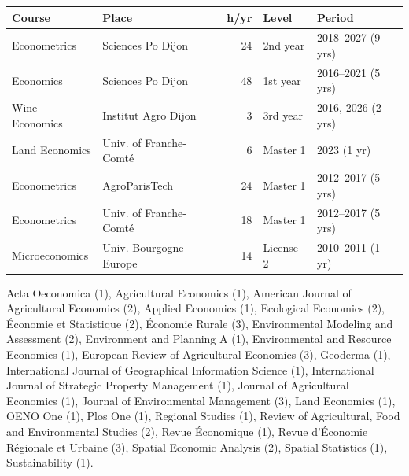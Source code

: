 \documentclass[12pt, a4paper]{./style}
\begin{document}
\begin{center}
\begin{tabular}{llrll}
\textbf{Course} & \textbf{Place} & \textbf{h/yr} & \textbf{Level} & \textbf{Period}\\
\hline
Econometrics & Sciences Po Dijon & 24 & 2nd year & 2018--2027 (9 yrs)\\
Economics & Sciences Po Dijon & 48 & 1st year & 2016--2021 (5 yrs)\\
Wine Economics & Institut Agro Dijon & 3 & 3rd year & 2016, 2026 (2 yrs)\\
Land Economics & Univ. of Franche-Comté & 6 & Master 1 & 2023 (1 yr)\\
Econometrics & AgroParisTech & 24 & Master 1 & 2012--2017 (5 yrs)\\
Econometrics & Univ. of Franche-Comté & 18 & Master 1 & 2012--2017 (5 yrs)\\
Microeconomics & Univ. Bourgogne Europe & 14 & License 2 & 2010--2011 (1 yr)\\
\hline
\end{tabular}
\end{center}
\label{sec:org59dabc6}

\vspace{.5cm}

Acta Oeconomica (1), Agricultural Economics (1), American Journal
of Agricultural Economics (2), Applied Economics (1), Ecological
Economics (2), Économie et Statistique (2), Économie Rurale (3),
Environmental Modeling and Assessment (2), Environment and Planning
A (1), Environmental and Resource Economics (1), European Review of
Agricultural Economics (3), Geoderma (1), International Journal of
Geographical Information Science (1), International Journal of
Strategic Property Management (1), Journal of Agricultural
Economics (1), Journal of Environmental Management (3), Land
Economics (1), OENO One (1), Plos One (1), Regional Studies (1),
Review of Agricultural, Food and Environmental Studies (2), Revue
Économique (1), Revue d'Économie Régionale et Urbaine (3), Spatial
Economic Analysis (2), Spatial Statistics (1), Sustainability (1).

\vspace{.5cm}
\label{sec:orge0ace11}
\end{document}
